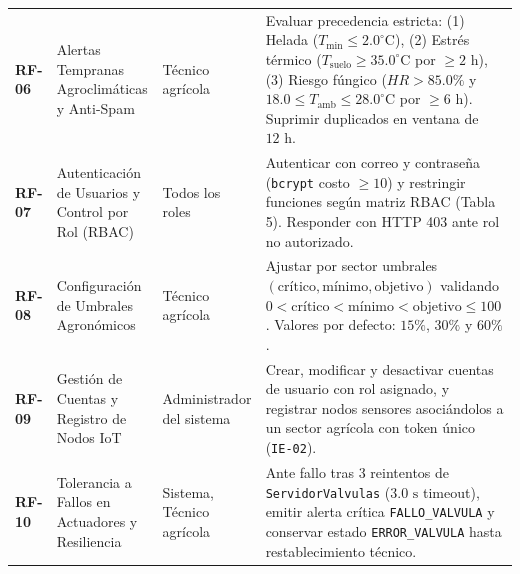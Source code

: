 \documentclass[11pt,letterpaper]{report}
\begin{document}
{\begin{longtable}{L{1.3cm} L{3.3cm} L{2.6cm} L{8.2cm}}
\textbf{RF-06} & Alertas Tempranas Agroclimáticas y Anti-Spam & Técnico agrícola & Evaluar precedencia estricta: (1) Helada ($T_{\min} \le 2.0^\circ\text{C}$), (2) Estrés térmico ($T_{\text{suelo}} \ge 35.0^\circ\text{C}$ por $\ge 2\text{ h}$), (3) Riesgo fúngico ($HR > 85.0\%$ y $18.0 \le T_{\text{amb}} \le 28.0^\circ\text{C}$ por $\ge 6\text{ h}$). Suprimir duplicados en ventana de $12\text{ h}$. \\
\textbf{RF-07} & Autenticación de Usuarios y Control por Rol (RBAC) & Todos los roles & Autenticar con correo y contraseña (\texttt{bcrypt} costo $\ge 10$) y restringir funciones según matriz RBAC (Tabla 5). Responder con HTTP 403 ante rol no autorizado. \\
\textbf{RF-08} & Configuración de Umbrales Agronómicos & Técnico agrícola & Ajustar por sector umbrales $(\text{crítico}, \text{mínimo}, \text{objetivo})$ validando $0 < \text{crítico} < \text{mínimo} < \text{objetivo} \le 100$. Valores por defecto: $15\%$, $30\%$ y $60\%$. \\
\textbf{RF-09} & Gestión de Cuentas y Registro de Nodos IoT & Administrador del sistema & Crear, modificar y desactivar cuentas de usuario con rol asignado, y registrar nodos sensores asociándolos a un sector agrícola con token único (\texttt{IE-02}). \\
\textbf{RF-10} & Tolerancia a Fallos en Actuadores y Resiliencia & Sistema, Técnico agrícola & Ante fallo tras 3 reintentos de \texttt{ServidorValvulas} ($3.0\text{ s}$ timeout), emitir alerta crítica \texttt{FALLO\_\allowbreak VALVULA} y conservar estado \texttt{ERROR\_\allowbreak VALVULA} hasta restablecimiento técnico. \\
\end{longtable}
}
\end{document}
